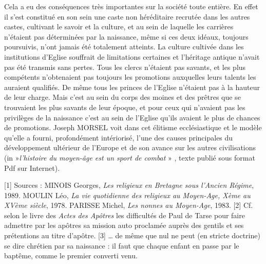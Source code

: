  Cela a eu des conséquences très importantes sur la société toute entière. En effet il s'est constitué en son sein une caste non héréditaire recrutée dans les autres castes, cultivant le savoir et la culture, et au sein de laquelle les carrières n'étaient pas déterminées par la naissance, même si ces deux idéaux, toujours poursuivis, n'ont jamais été totalement atteints. La culture cultivée dans les institutions d'Eglise souffrait de limitations certaines et l'héritage antique n'avait pas été transmis sans pertes. Tous les clercs n'étaient pas savants, et les plus compétents n'obtenaient pas toujours les promotions auxquelles leurs talents les auraient qualifiés. De même tous les princes de l'Eglise n'étaient pas à la hauteur de leur charge. Mais c'est au sein du corps des moines et des prêtres que se trouvaient les plus savants de leur époque, et pour ceux qui n'avaient pas les privilèges de la naissance c'est au sein de l'Eglise qu'ils avaient le plus de chances de promotions. Joseph MORSEL voit dans cet élitisme ecclésiastique et le modèle qu'elle a fourni, profondément intériorisé, l'une des causes principales du développement ultérieur de l'Europe et de son avance sur les autres civilisations (in »\emph{l'histoire du moyen-âge est un sport de combat} » , texte publié sous format Pdf sur Internet).
 
[1] Sources : MINOIS Georges, \emph{Les religieux en Bretagne sous l'Ancien Régime}, 1989. MOULIN Léo, \emph{La vie quotidienne des religieux au Moyen-Age, Xème au XVème siècle}, 1978. PARISSE Michel, \emph{Les nonnes au Moyen-Age}, 1983.
[2] Cf. selon le livre des \emph{Actes des Apôtres} les difficultés de Paul de Tarse pour faire admettre par les apôtres sa mission auto proclamée auprès des gentils et ses prétentions au titre d'apôtre.
[3] … de même que nul ne peut (en stricte doctrine) se dire chrétien par sa naissance : il faut que chaque enfant en passe par le baptême, comme le premier converti venu.